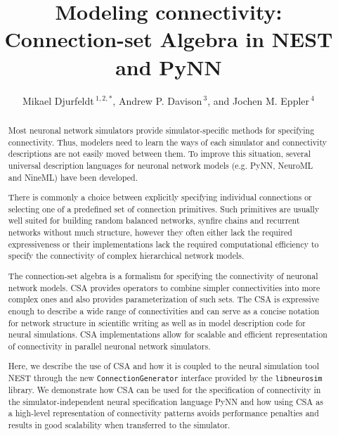 \documentclass{frontiersSCNS} %
\def\firstAuthorLast{Djurfeldt {et~al.}}
\def\Authors{Mikael Djurfeldt\,$^{1,2,*}$, Andrew P. Davison\,$^{3}$,
 and Jochen M. Eppler\,$^4$}
\begin{document}
\onecolumn
{}

\title[CSA in NEST and PyNN]{Modeling connectivity: Connection-set
 Algebra in NEST and PyNN}
\author[\firstAuthorLast ]{\Authors}
\address{}
\correspondance{}
\extraAuth{}%

\maketitle
\begin{abstract} %

Most neuronal network simulators provide simulator-specific methods
for specifying connectivity. Thus, modelers need to learn the ways of
each simulator and connectivity descriptions are not easily moved
between them.  To improve this situation, several universal
description languages for neuronal network models (e.g. PyNN, NeuroML
and NineML) have been developed.

There is commonly a choice between explicitly specifying individual
connections or selecting one of a predefined set of connection
primitives. Such primitives are usually well suited for building
random balanced networks, synfire chains and recurrent networks
without much structure, however they often either lack the required
expressiveness or their implementations lack the required
computational efficiency to specify the connectivity of complex
hierarchical network models.

The connection-set algebra is a formalism for specifying the
connectivity of neuronal network models. CSA provides operators to
combine simpler connectivities into more complex ones and also
provides parameterization of such sets. The CSA is expressive enough
to describe a wide range of connectivities and can serve as a concise
notation for network structure in scientific writing as well as in
model description code for neural simulations. CSA implementations
allow for scalable and efficient representation of connectivity in
parallel neuronal network simulators.

Here, we describe the use of CSA and how it is coupled to the neural
simulation tool NEST through the new \verb|ConnectionGenerator|
interface provided by the \verb|libneurosim| library. We demonstrate
how CSA can be used for the specification of connectivity in the
simulator-independent neural specification language PyNN and how using
CSA as a high-level representation of connectivity patterns avoids
performance penalties and results in good scalability when transferred
to the simulator.


\end{abstract}
\end{document}
